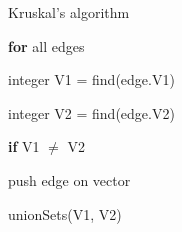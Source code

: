 \documentclass[../Head/Main.tex]{subfiles}
\begin{document}
\begin{Pseudo}{Kruskal's algorithm}{}

 	\textbf{for} all edges  
	\begin{Indentation}
		\item 
		\begin{Indentation}
			\item integer V1 = find(edge.V1)
			\item integer V2 = find(edge.V2)
			\item \textbf{if} V1 $\neq$ V2   	
			\item push edge on vector
			\item unionSets(V1, V2)
		\end{Indentation}
	\end{Indentation}

\end{Pseudo} 
\end{document}
